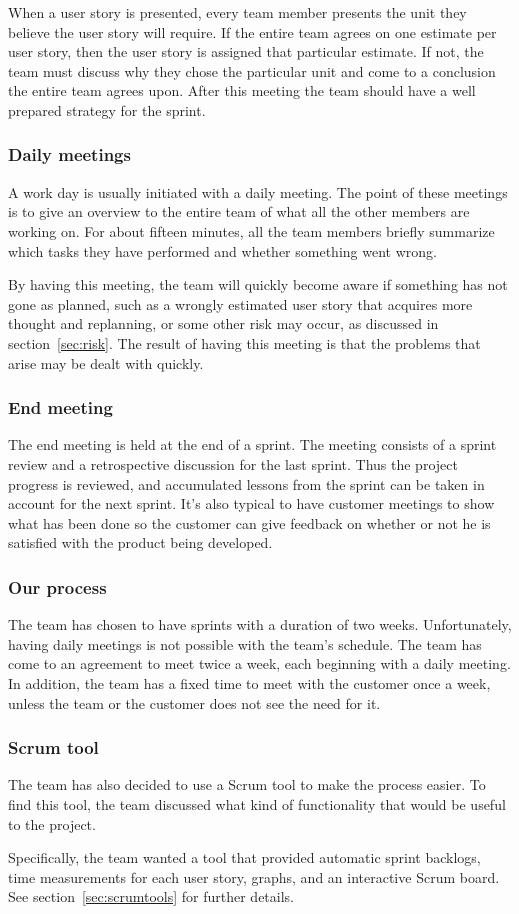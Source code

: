 When a user story is presented, every team member presents the unit they believe the user story will require. If the entire team agrees on one estimate per user story, then the user story is assigned that particular estimate. If not, the team must discuss why they chose the particular unit and come to a conclusion the entire team agrees upon.
After this meeting the team should have a well prepared strategy for the sprint.

\subsubsection{Daily meetings}
A work day is usually initiated with a daily meeting. The point of these meetings is to give an overview to the entire team of what all the other members are working on. For about fifteen minutes, all the team members briefly summarize which tasks they have performed and whether something went wrong.

By having this meeting, the team will quickly become aware if something has not gone as planned, such as a wrongly estimated user story that acquires more thought and replanning, or some other risk may occur, as discussed in section~\ref{sec:risk}. The result of having this meeting is that the problems that arise may be dealt with quickly.

\subsubsection{End meeting}
The end meeting is held at the end of a sprint. The meeting consists of a sprint review and a retrospective discussion for the last sprint.
Thus the project progress is reviewed, and accumulated lessons from the sprint can be taken in account for the next sprint.
It's also typical to have customer meetings to show what has been done so the customer can give feedback on 
whether or not he is satisfied with the product being developed.

\subsubsection{Our process}
The team has chosen to have sprints with a duration of two weeks. Unfortunately, having daily meetings is not possible with the team's schedule. The team has come to an agreement to meet twice a week, each beginning with a daily meeting. In addition, the team has a fixed time to meet with the customer once a week, unless the team or the customer does not see the need for it.

\subsubsection{Scrum tool}
The team has also decided to use a Scrum tool to make the process easier.
To find this tool, the team discussed what kind of functionality that would be useful to the project.

Specifically, the team wanted a tool that provided automatic sprint backlogs, time measurements for each user story, graphs, and an interactive Scrum board. See section~\ref{sec:scrumtools} for further details.

